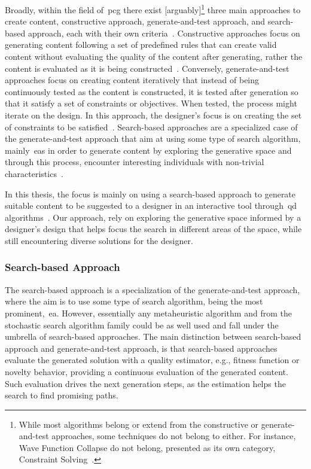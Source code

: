 Broadly, within the field of~\acrshort{pcg} there exist [arguably]\footnote{While most algorithms belong or extend from the constructive or generate-and-test approaches, some techniques do not belong to either. For instance, Wave Function Collapse do not belong, presented as its own category, Constraint Solving~\cite{Karth2017-WFC}.} three main approaches to create content, constructive approach, generate-and-test approach, and search-based approach, each with their own criteria~\cite{Togelius2011}. Constructive approaches focus on generating content following a set of predefined rules that can create valid content without evaluating the quality of the content after generating, rather the content is evaluated as it is being constructed~\cite{Karth2019-pcgmlDiscriminativeLearning,Snodgrass19-BSPExampleDriven}. Conversely, generate-and-test approaches focus on creating content iteratively that instead of being continuously tested as the content is constructed, it is tested after generation so that it satisfy a set of constraints or objectives. When tested, the process might iterate on the design. In this approach, the designer's focus is on creating the set of constraints to be satisfied~\cite{Summerville2018-GEMINI,Volz2018-GANevo}. Search-based approaches are a specialized case of the generate-and-test approach that aim at using some type of search algorithm, mainly~\acrlong{ea}s in order to generate content by exploring the generative space and through this process, encounter interesting individuals with non-trivial characteristics~\cite{hastings_evolving_2009,Font2016ConstrainedAlgorithms}.


In this thesis, the focus is mainly on using a search-based approach to generate suitable content to be suggested to a designer in an interactive tool through~\acrshort{qd} algorithms~\cite{gravina2019procedural}. Our approach, rely on exploring the generative space informed by a designer's design that helps focus the search in different areas of the space, while still encountering diverse solutions for the designer.

\subsubsection{Search-based Approach}

The search-based approach is a specialization of the generate-and-test approach, where the aim is to use some type of search algorithm, being the most prominent,~\acrlong{ea}. However, essentially any metaheuristic algorithm and from the stochastic search algorithm family could be as well used and fall under the umbrella of search-based approaches. The main distinction between search-based approach and generate-and-test approach, is that search-based approaches evaluate the generated solution with a quality estimator, e.g., fitness function or novelty behavior, providing a continuous evaluation of the generated content. Such evaluation drives the next generation steps, as the estimation helps the search to find promising paths.

